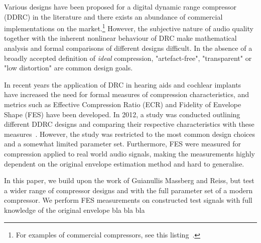 \documentclass[../main2.tex]{subfiles}
\begin{document}
Various designs have been proposed for a digital dynamic range compressor (DDRC) in the literature and there exists an abundance of commercial implementations on the market.\footnote{For examples of commercial compressors, see this listing~\cite{commercial}.} However, the subjective nature of audio quality together with the inherent nonlinear behaviour of DRC make mathematical analysis and formal comparisons of different designs difficult. In the absence of a broadly accepted definition of \emph{ideal} compression, "artefact-free", "transparent" or "low distortion" are common design goals.

In recent years the application of DRC in hearing aids and cochlear implants have increased the need for formal measures of compression characteristics, and metrics such as Effective Compression Ratio (ECR) and Fidelity of Envelope Shape (FES) have been developed. In 2012, a study was conducted outlining different DDRC designs and comparing their respective characteristics with these measures~\cite{reiss2012tutorial}. However, the study was restricted to the most common design choices and a somewhat limited parameter set. Furthermore, FES were measured for compression applied to real world audio signals, making the measurements highly dependent on the original envelope estimation method and hard to generalise.

In this paper, we build upon the work of Guianullis Massberg and Reiss, but test a wider range of compressor designs and with the full parameter set of a modern compressor. We perform FES measurements on constructed test signals with full knowledge of the original envelope bla bla bla


\end{document}
